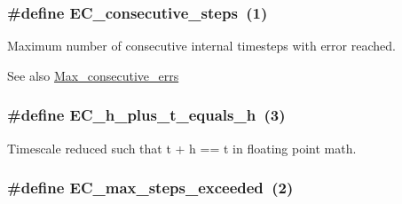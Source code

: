 \subsubsection[{\texorpdfstring{E\+C\+\_\+consecutive\+\_\+steps}{EC_consecutive_steps}}]{\setlength{\rightskip}{0pt plus 5cm}\#define E\+C\+\_\+consecutive\+\_\+steps~(1)}\hypertarget{group__RK__ErrCodes_gae0287841c08f86f5709660fd731615ad}{}\label{group__RK__ErrCodes_gae0287841c08f86f5709660fd731615ad}


Maximum number of consecutive internal timesteps with error reached. 

\begin{DoxySeeAlso}{See also}
\hyperlink{radau2a_8cu_a172b5bc0830959ab49ca7cb9f0ae44bf}{Max\+\_\+consecutive\+\_\+errs} 
\end{DoxySeeAlso}
\subsubsection[{\texorpdfstring{E\+C\+\_\+h\+\_\+plus\+\_\+t\+\_\+equals\+\_\+h}{EC_h_plus_t_equals_h}}]{\setlength{\rightskip}{0pt plus 5cm}\#define E\+C\+\_\+h\+\_\+plus\+\_\+t\+\_\+equals\+\_\+h~(3)}\hypertarget{group__RK__ErrCodes_ga9326efd544880e2683c4453365ca2704}{}\label{group__RK__ErrCodes_ga9326efd544880e2683c4453365ca2704}


Timescale reduced such that t + h == t in floating point math. 

\subsubsection[{\texorpdfstring{E\+C\+\_\+max\+\_\+steps\+\_\+exceeded}{EC_max_steps_exceeded}}]{\setlength{\rightskip}{0pt plus 5cm}\#define E\+C\+\_\+max\+\_\+steps\+\_\+exceeded~(2)}\hypertarget{group__RK__ErrCodes_ga0f0275d9851ab5c19b79a963d5084df3}{}\label{group__RK__ErrCodes_ga0f0275d9851ab5c19b79a963d5084df3}


